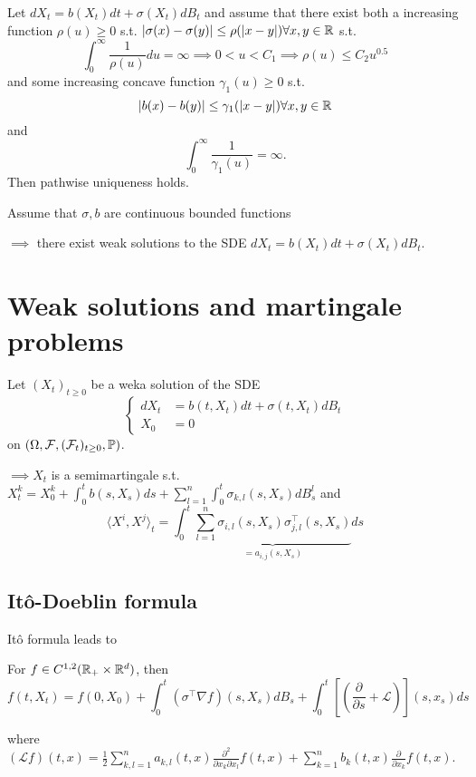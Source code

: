 \begin{theorem}\label{thm:1.12}
    Let $dX_t=b(X_t)dt+\sigma(X_t)dB_t$ 
    and assume that there exist both a increasing function $\rho(u)\geq 0$ s.t. $|\sigma(x)-\sigma(y)|\leq \rho(|x-y|)\forall x,y\in\mathbb{R}$
    s.t. 
    \[\int_0^\infty \frac{1}{\rho(u)}du=\infty\implies 0<u<C_1\implies \rho(u)\leq C_2 u^{0.5}\]
    and some increasing concave function $\gamma_1(u)\geq 0$ s.t. 
    \[|b(x)-b(y)|\leq \gamma_1(|x-y|)\forall x,y\in\mathbb{R}\] and 
    \[\int_0^\infty\frac{1}{\gamma_1(u)}=\infty.\]
    Then pathwise uniqueness holds.
\end{theorem}

\begin{theorem}[Storokhod]\label{thm::1.13-storokhod}
    Assume that $\sigma,b$ are continuous bounded functions 
    
    $\implies$ there exist weak solutions to the SDE $dX_t=b(X_t)dt+\sigma(X_t)dB_t$.
\end{theorem}

\section{Weak solutions and martingale problems}

Let $(X_t)_{t\geq 0}$ be a weka solution of the SDE \[\begin{cases}
    dX_t&=b(t,X_t)dt+\sigma(t,X_t)dB_t\\X_0&=0
\end{cases}\]
on $(\Omega,\mathcal{F},(\mathcal{F}_t)_{t\geq 0},\mathbb{P})$. 

$ \implies X_t$ is a semimartingale s.t. $X_t^k=X_0^k+\int_0^t b(s,X_s)ds+\sum_{l=1}^n\int_0^t \sigma_{k,l}(s,X_s)dB_s^l$
and \[\langle X^i,X^j\rangle_t=\int_0^t \underbrace{\sum_{l=1}^{n}\sigma_{i,l}(s,X_s)\sigma_{j,l}^\intercal(s,X_s)}_{=a_{i,j}(s,X_s)}ds\]

\subsection{Itô-Doeblin formula}

Itô formula leads to 

\begin{proposition}\label{prop:1.14}
    For $f\in C^{1,2}(\mathbb{R}_+\times\mathbb{R}^d)$, then 
    \[f(t,X_t)=f(0,X_0)+\int_0^t(\sigma^\intercal\nabla f)(s,X_s)dB_s+\int_0^t\left[\left(\frac{\partial}{\partial s}+\mathcal{L}\right)\right](s,x_s)ds\]

    where $(\mathcal{L}f)(t,x)=\frac{1}{2}\sum_{k,l=1}^{n}a_{k,l}(t,x)\frac{\partial^2}{\partial x_k\partial x_l}f(t,x)+\sum_{k=1}^n b_k(t,x)\frac{\partial}{\partial x_k}f(t,x)$.

\end{proposition}

